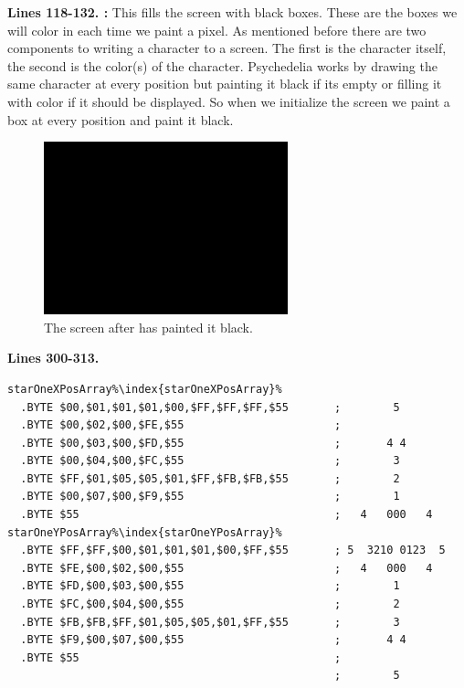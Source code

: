 \bigskip
\bigskip
\bigskip
\bigskip
\textbf{Lines 118-132. :} This fills the screen with black boxes. These are the boxes we will color in each time we paint a pixel.
As mentioned before there are two components to writing a character to a screen. The first is the character
itself, the second is the color(s) of the character. Psychedelia works by drawing the same character at every
position but painting it black if its empty or filling it with color if it should be displayed. So when
we initialize the screen we paint a box at every position and paint it black.

\begin{figure}[H]
    \centering
      \includegraphics[height=5cm]{src/listing_commentary/black.png}
  \caption*{The screen after  has painted it black.}
\end{figure}

\clearpage
\textbf{Lines 300-313. }
\begin{lstlisting}[caption = Hopefully this looks familiar.,escapechar=\%]
starOneXPosArray%\index{starOneXPosArray}%
  .BYTE $00,$01,$01,$01,$00,$FF,$FF,$FF,$55       ;        5       
  .BYTE $00,$02,$00,$FE,$55                       ;                
  .BYTE $00,$03,$00,$FD,$55                       ;       4 4      
  .BYTE $00,$04,$00,$FC,$55                       ;        3       
  .BYTE $FF,$01,$05,$05,$01,$FF,$FB,$FB,$55       ;        2       
  .BYTE $00,$07,$00,$F9,$55                       ;        1       
  .BYTE $55                                       ;   4   000   4  
starOneYPosArray%\index{starOneYPosArray}%
  .BYTE $FF,$FF,$00,$01,$01,$01,$00,$FF,$55       ; 5  3210 0123  5
  .BYTE $FE,$00,$02,$00,$55                       ;   4   000   4  
  .BYTE $FD,$00,$03,$00,$55                       ;        1       
  .BYTE $FC,$00,$04,$00,$55                       ;        2       
  .BYTE $FB,$FB,$FF,$01,$05,$05,$01,$FF,$55       ;        3       
  .BYTE $F9,$00,$07,$00,$55                       ;       4 4      
  .BYTE $55                                       ;                
                                                  ;        5       
\end{lstlisting}

